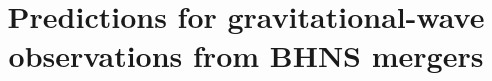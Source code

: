 \documentclass[twocolumn]{aastex63}
\newcommand\bhnsSingle{BHNS\xspace}
\begin{document}
\title{Predictions for  gravitational-wave observations from \bhnsSingle mergers }


\end{document}
